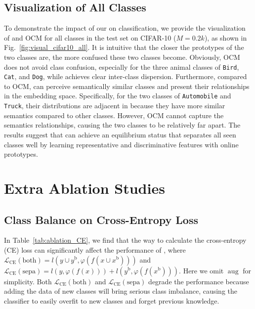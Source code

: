 \subsection{Visualization of All Classes} 


To demonstrate the impact of our \frameworkName on classification, we provide the visualization of \frameworkName and OCM for all classes in the {test set} on CIFAR-10 ($M=0.2k$), as shown in Fig.~\ref{fig:visual_cifar10_all}. It is intuitive that the closer the prototypes of the two classes are, the more confused these two classes become. Obviously, OCM does not avoid class confusion, especially for the three animal classes of \texttt{Bird}, \texttt{Cat}, and \texttt{Dog}, while \frameworkName achieves clear inter-class dispersion. 
Furthermore, compared to OCM, \frameworkName can perceive semantically similar classes and present their relationships in the embedding space. Specifically, for the two classes of \texttt{Automobile} and \texttt{Truck}, their distributions are adjacent in \frameworkName because they have more similar semantics compared to other classes. 
However, OCM cannot capture the semantics relationships, causing the two classes to be relatively far apart. 
The results suggest that \frameworkName can achieve an equilibrium status that separates all
seen classes well by learning representative and discriminative features with online prototypes.





\section{Extra Ablation Studies}
\label{appendix:ablations}
\subsection{Class Balance on Cross-Entropy Loss} 
\label{appendix:ablation_CE}
In Table~\ref{tab:ablation_CE}, we find that the way to calculate the cross-entropy (CE) loss can significantly affect the performance of \frameworkName, where $\mathcal{L}_\mathrm{CE}(\mathrm{both}) = l(y \cup y^\mathrm{b}, \varphi(f(x \cup x^\mathrm{b})))$ and $\mathcal{L}_\mathrm{CE}(\mathrm{sepa}) = l(y, \varphi(f(x))) + l(y^\mathrm{b}, \varphi(f(x^\mathrm{b})))$. Here we omit $\operatorname{aug}$ for simplicity. Both $\mathcal{L}_\mathrm{CE}(\mathrm{both})$ and $\mathcal{L}_\mathrm{CE}(\mathrm{sepa})$ degrade the performance because adding the data of new classes will bring serious class imbalance, causing the classifier to easily overfit to new classes and forget previous knowledge.



